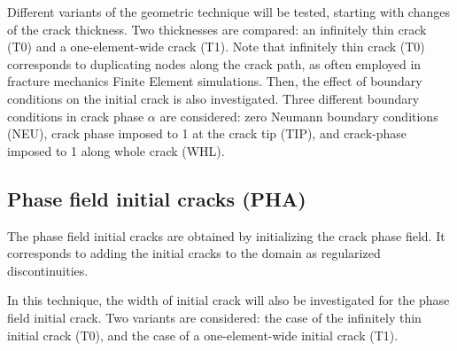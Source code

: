 \documentclass[OptSoft]{jtcam_preprint}
\begin{document}
Different variants of the geometric technique will be tested, starting with changes of the crack thickness.
Two thicknesses are compared: an infinitely thin crack (T0) and a one-element-wide crack (T1).
Note that infinitely thin crack (T0) corresponds to duplicating nodes along the crack path, as often employed in fracture mechanics Finite Element simulations.
Then, the effect of boundary conditions on the initial crack is also investigated.
Three different boundary conditions in crack phase $\alpha$ are considered: zero Neumann boundary conditions (NEU), crack phase imposed to 1 at the crack tip (TIP), and crack-phase imposed to 1 along whole crack (WHL).

\subsection{Phase field initial cracks (PHA)}

The phase field initial cracks are obtained by initializing the crack phase field.
It corresponds to adding the initial cracks to the domain as regularized discontinuities.

In this technique, the width of initial crack will also be investigated for the phase field initial crack.
Two variants are considered: the case of the infinitely thin initial crack (T0), and the case of a one-element-wide initial crack (T1).
\end{document}
